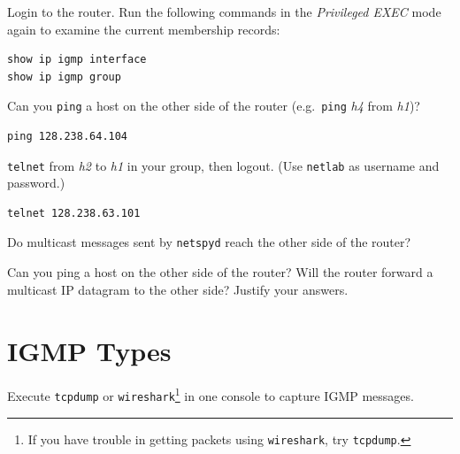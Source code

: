 \documentclass{../UTNetLab}
\begin{document}
Login to the router.
Run the following commands in the \textit{Privileged EXEC} mode again to examine the current membership records:

\begin{lstlisting}[language=cisco]
show ip igmp interface
show ip igmp group
    \end{lstlisting}

Can you \lstinline{ping} a host on the other side of the router (e.g.\ \lstinline{ping} \textit{h4} from \textit{h1})?

\begin{lstlisting}
ping 128.238.64.104
    \end{lstlisting}

\lstinline{telnet} from \textit{h2} to \textit{h1} in your group, then logout. (Use \texttt{netlab} as username and password.)

\begin{lstlisting}
telnet 128.238.63.101
    \end{lstlisting}
Do multicast messages sent by \lstinline{netspyd} reach the other side of the router?


\begin{report}
    \item Can you ping a host on the other side of the router?
    Will the router forward a multicast IP datagram to the other side?
    Justify your answers.
\end{report}

\section{IGMP Types}
Execute \lstinline{tcpdump} or \lstinline{wireshark}\footnote{If you have trouble in getting packets using \lstinline{wireshark}, try \lstinline{tcpdump}.} in one console to capture IGMP messages.
\end{document}
